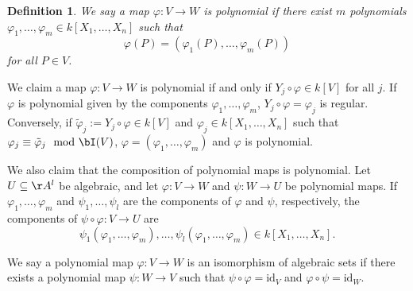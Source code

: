 \documentclass[12pt]{amsart}
\theoremstyle{plain}
\newtheorem{definition}[theorem]{Definition}
\theoremstyle{definition}
\begin{document}
\begin{definition}
We say a map $\varphi : V \to W$ is polynomial if there exist $m$ polynomials $\varphi_1, \ldots, \varphi_m \in k[X_1, \ldots, X_n]$ such that
$$\varphi(P) = (\varphi_1(P), \ldots, \varphi_m(P))$$
for all $P \in V$.
\end{definition}

We claim a map $\varphi: V \to W$ is polynomial if and only if $Y_j \circ \varphi \in k[V]$ for all $j$.
If $\varphi$ is polynomial given by the components $\varphi_1, \ldots, \varphi_m$, $Y_j \circ \varphi = \varphi_j$ is regular.
Conversely, if $\tilde \varphi_j := Y_j \circ \varphi \in k[V]$ and $\varphi_j \in k[X_1, \ldots, X_n]$ such that $\varphi_j \equiv \tilde \varphi_j \mod \bI(V)$, $\varphi = (\varphi_1, \ldots, \varphi_m)$ and $\varphi$ is polynomial.

We also claim that the composition of polynomial maps is polynomial.
Let $U \subseteq \AA^l$ be algebraic, and let $\varphi: V \to W$ and $\psi : W \to U$ be polynomial maps.
If $\varphi_1, \ldots, \varphi_m$ and $\psi_1, \ldots, \psi_l$ are the components of $\varphi$ and $\psi$, respectively, the components of $\psi \circ \varphi : V \to U$ are
$$\psi_1(\varphi_1, \ldots, \varphi_m), \ldots, \psi_l(\varphi_1, \ldots, \varphi_m) \in k[X_1, \ldots, X_n].$$

We say a polynomial map $\varphi : V \to W$ is an isomorphism of algebraic sets if there exists a polynomial map $\psi: W \to V$ such that $\psi \circ \varphi = \mathrm{id}_V$ and $\varphi \circ \psi = \mathrm{id}_W$.
\end{document}
